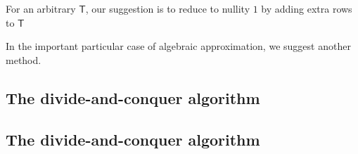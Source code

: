 \documentclass{sig-alternate}
\newcommand{\mT}{\ensuremath{\mathsf{T}}}
\begin{document}
For an arbitrary $\mT$, our suggestion is to reduce to 
nullity $1$ by adding extra rows to $\mT$

In the important particular case of algebraic approximation,
we suggest another method.


\subsection{The divide-and-conquer algorithm}


\subsection{The divide-and-conquer algorithm}





 {\scriptsize }
\end{document}

